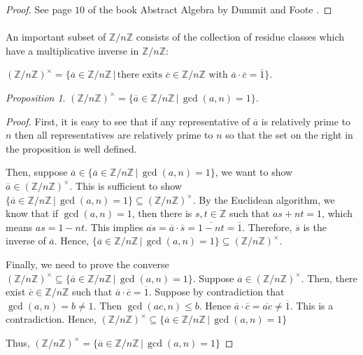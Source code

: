 \documentclass[paper=a4, fontsize=11pt]{scrartcl}
\numberwithin{equation}{section}		%
\numberwithin{figure}{section}			%
\numberwithin{table}{section}				%
\theoremstyle{definition}
\theoremstyle{remark}
\theoremstyle{example}
\newtheorem{prop}{Proposition}[section]
\begin{document}
\begin{proof}
    See page $10$ of the book Abstract Algebra by Dummit and Foote \cite{foote_abstract_2003}.
\end{proof}

\paragraph{}

An important subset of $\mathbb{Z}/n\mathbb{Z}$ consists of the collection of residue classes which have a multiplicative inverse in $\mathbb{Z}/n\mathbb{Z}$: 
\begin{center}
    $(\mathbb{Z}/n\mathbb{Z})^{\times} = \{\overline{a} \in \mathbb{Z}/n\mathbb{Z} \,\lvert\, \text{there exits } \overline{c} \in \mathbb{Z}/n\mathbb{Z} \text{ with } \overline{a}\cdot \overline{c} = \overline{1}\}$.
\end{center}

\begin{prop}
    $(\mathbb{Z}/n\mathbb{Z})^{\times} = \{\overline{a}\in\mathbb{Z}/n\mathbb{Z} \,\lvert\,\gcd(a,n) = 1\}$.
\end{prop}

\begin{proof}
    First, it is easy to see that if any representative of $\overline{a}$ is relatively prime to $n$ then all representatives are relatively prime to $n$ so that the set on the right in the proposition is well defined.
    
    Then, suppose $\overline{a}\in \{\overline{a}\in\mathbb{Z}/n\mathbb{Z} \,\lvert\,\gcd(a,n) = 1\}$, we want to show $\overline{a} \in (\mathbb{Z}/n\mathbb{Z})^{\times}$. This is sufficient to show $\{\overline{a}\in\mathbb{Z}/n\mathbb{Z} \,\lvert\,\gcd(a,n) = 1\} \subseteq (\mathbb{Z}/n\mathbb{Z})^{\times}$. By the Euclidean algorithm, we know that if $\gcd(a,n) = 1$, then there is $s,t \in \mathbb{Z}$ such that $as + nt = 1$, which means $as = 1 - nt$. This implies $\overline{as}=\overline{a}\cdot \overline{s} = \overline{1-nt} = \overline{1}$. Therefore, $\overline{s}$ is the inverse of $\overline{a}$. Hence, $\{\overline{a}\in\mathbb{Z}/n\mathbb{Z} \,\lvert\,\gcd(a,n) = 1\} \subseteq (\mathbb{Z}/n\mathbb{Z})^{\times}$.
    
    Finally, we need to prove the converse $(\mathbb{Z}/n\mathbb{Z})^{\times} \subseteq \{\overline{a}\in\mathbb{Z}/n\mathbb{Z} \,\lvert\,\gcd(a,n) = 1\}$. Suppose $\overline{a} \in (\mathbb{Z}/n\mathbb{Z})^{\times}$. Then, there exist $\overline{c} \in \mathbb{Z}/n\mathbb{Z}$ such that $\overline{a}\cdot\overline{c} = \overline{1}$. Suppose by contradiction that $\gcd(a,n) = b \neq 1$. Then $\gcd(ac,n) \leq b$. Hence $\overline{a} \cdot \overline{c} = \overline{ac} \neq \overline{1}$. This is a contradiction. Hence, $(\mathbb{Z}/n\mathbb{Z})^{\times} \subseteq \{\overline{a}\in\mathbb{Z}/n\mathbb{Z} \,\lvert\,\gcd(a,n) = 1\}$
    
    Thus, $(\mathbb{Z}/n\mathbb{Z})^{\times} = \{\overline{a}\in\mathbb{Z}/n\mathbb{Z} \,\lvert\,\gcd(a,n) = 1\}$
\end{proof}
\end{document}
